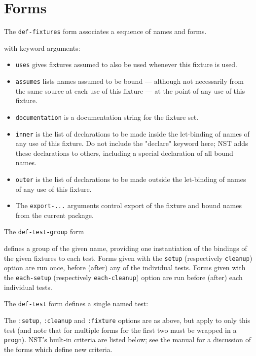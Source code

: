 \documentclass{article}
\begin{document}
\section*{Forms}
The \texttt{def-fixtures} form associates a sequence of names and
forms.

with keyword arguments:
\begin{itemize}

\item\texttt{uses} gives fixtures assumed to also be used whenever
  this fixture is used.

\item\texttt{assumes} lists names assumed to be bound --- although not
  necessarily from the same source at each use of this fixture --- at
  the point of any use of this fixture.

\item\texttt{documentation} is a documentation string for the fixture
  set.

\item\texttt{inner} is the list of declarations to be made inside the
  let-binding of names of any use of this fixture.  Do not include the
  "declare" keyword here; NST adds these declarations to others,
  including a special declaration of all bound names.

\item\texttt{outer} is the list of declarations to be made outside the
  let-binding of names of any use of this fixture.

\item The \texttt{export-...} arguments control export of the fixture
  and bound names from the current package.
\end{itemize}

The \texttt{def-test-group} form 

defines a group of the given name, providing one instantiation of the
bindings of the given fixtures to each test.  Forms given with the
\texttt{setup} (respectively \texttt{cleanup}) option are run once,
before (after) any of the individual tests.  Forms given with the
\texttt{each-setup} (respectively \texttt{each-cleanup}) option are
run before (after) each individual tests.

The \texttt{def-test} form defines a single named test:

The \texttt{:setup}, \texttt{:cleanup} and \texttt{:fixture} options
are as above, but apply to only this test (and note that for multiple
forms for the first two must be wrapped in a \texttt{progn}).  NST's
built-in criteria are listed below; see the manual for a discussion of
the forms which define new criteria.
\end{document}

